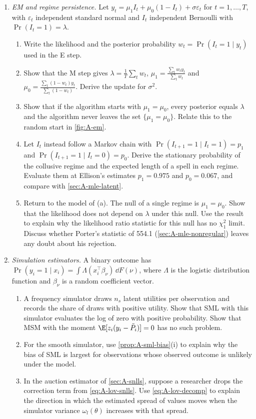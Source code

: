 \begin{enumerate}[label=\arabic*., leftmargin=*, itemsep=6pt]
\item \textit{EM and regime persistence.} Let $y_t = \mu_1I_t + \mu_0(1 - I_t) + \sigma\varepsilon_t$ for
$t = 1, \dots, T$, with $\varepsilon_t$ independent standard normal and $I_t$ independent Bernoulli with
$\Pr(I_t = 1) = \lambda$.
\begin{enumerate}[label=(\alph*)]
  \item Write the likelihood and the posterior probability $w_t = \Pr(I_t = 1 \mid y_t)$ used in the E step.
  \item Show that the M step gives $\lambda = \frac{1}{T}\sum_tw_t$, $\mu_1 = \frac{\sum_tw_ty_t}{\sum_tw_t}$ and
  $\mu_0 = \frac{\sum_t(1 - w_t)y_t}{\sum_t(1 - w_t)}$. Derive the update for $\sigma^2$.
  \item Show that if the algorithm starts with $\mu_1 = \mu_0$, every posterior equals $\lambda$ and the algorithm never
  leaves the set $\{\mu_1 = \mu_0\}$. Relate this to the random start in \cref{fig:A-em}.
  \item Let $I_t$ instead follow a Markov chain with $\Pr(I_{t+1} = 1 \mid I_t = 1) = p_1$ and
  $\Pr(I_{t+1} = 1 \mid I_t = 0) = p_0$. Derive the stationary probability of the collusive regime and the expected
  length of a spell in each regime. Evaluate them at Ellison's estimates $p_1 = 0.975$ and $p_0 = 0.067$, and compare
  with \cref{sec:A-mle-latent}.
  \item Return to the model of (a). The null of a single regime is $\mu_1 = \mu_0$. Show that the likelihood does not
  depend on $\lambda$ under this null. Use the result to explain why the likelihood ratio statistic for this null has
  no $\chi^2_1$ limit. Discuss whether Porter's statistic of 554.1 (\cref{sec:A-mle-nonregular}) leaves any doubt
  about his rejection.
\end{enumerate}

\item \textit{Simulation estimators.} A binary outcome has $\Pr(y_i = 1 \mid x_i) = \int\Lambda(x_i^\top\beta_\nu)\,\dd F(\nu)$,
where $\Lambda$ is the logistic distribution function and $\beta_\nu$ is a random coefficient vector.
\begin{enumerate}[label=(\alph*)]
  \item A frequency simulator draws $n_s$ latent utilities per observation and records the share of draws with
  positive utility. Show that SML with this simulator evaluates the log of zero with positive probability. Show that
  MSM with the moment $\E[z_i(y_i - \tilde P_i)] = 0$ has no such problem.
  \item For the smooth simulator, use \cref{prop:A-sml-bias}(i) to explain why the bias of SML is largest for
  observations whose observed outcome is unlikely under the model.
  \item In the auction estimator of \cref{sec:A-snlls}, suppose a researcher drops the correction term from
  \eqref{eq:A-lov-snlls}. Use \eqref{eq:A-lov-decomp} to explain the direction in which the estimated spread of values
  moves when the simulator variance $\omega_l(\theta)$ increases with that spread.
\end{enumerate}


\end{enumerate}
